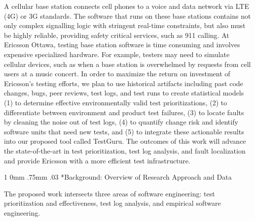 \documentclass[12pt, letterpaper]{article}
\makeatletter
\renewcommand{\section}{\@startsection
{section}%
{1}%
{0mm}%
{.75mm}
{.03\baselineskip}%
{\normalfont\large\bf} %
}
\makeatother
\begin{document}
\fancyhead{}
\pagestyle{fancy}
\renewcommand{\headrulewidth}{0pt}

\begin{center}
\begin{LARGE}
\noindent
{}
\end{LARGE}
\end{center}



A cellular base station connects cell phones to a voice and data network via
LTE (4G) or 3G standards. The software that runs on these base stations
contains not only complex signalling logic with stringent real-time
constraints, but also must be highly reliable, providing safety critical
services, such as 911 calling. At Ericsson Ottawa, testing base station
software is time consuming and involves expensive specialized hardware. For
example, testers may need to simulate cellular devices, such as when a base
station is overwhelmed by requests from cell users at a music concert. In order
to maximize the return on investment of Ericsson's testing efforts, we plan to
use historical artifacts including past code changes, bugs, peer reviews, test
logs, and test runs to create statistical models (1) to determine effective
environmentally valid test prioritizations, (2) to differentiate between
environment and product test failures, (3) to locate faults by cleaning the
noise out of test logs, (4) to quantify change risk and identify software units
that need new tests, and (5) to integrate these actionable results into our
proposed tool called TestGuru. The outcomes of this work will advance the
state-of-the-art in test prioritization, test log analysis, and fault
localization and provide Ericsson with a more efficient test infrastructure.

\section*{Background: Overview of Research Approach and Data}

The proposed work intersects three areas of software engineering: test
prioritization and effectiveness, test log analysis, and empirical software engineering. 
\end{document}
